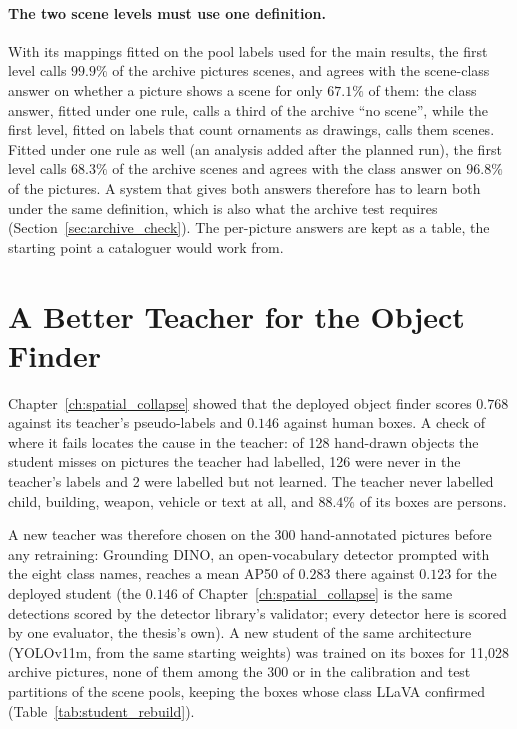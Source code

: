 \paragraph{The two scene levels must use one definition.} With its mappings fitted on the pool labels used for the main results, the first level calls $99.9\%$ of the archive pictures scenes, and agrees with the scene-class answer on whether a picture shows a scene for only $67.1\%$ of them: the class answer, fitted under one rule, calls a third of the archive ``no scene'', while the first level, fitted on labels that count ornaments as drawings, calls them scenes. Fitted under one rule as well (an analysis added after the planned run), the first level calls $68.3\%$ of the archive scenes and agrees with the class answer on $96.8\%$ of the pictures. A system that gives both answers therefore has to learn both under the same definition, which is also what the archive test requires (Section~\ref{sec:archive_check}). The per-picture answers are kept as a table, the starting point a cataloguer would work from.

\section{A Better Teacher for the Object Finder}
\label{sec:student_rebuild}

Chapter~\ref{ch:spatial_collapse} showed that the deployed object finder scores $0.768$ against its teacher's pseudo-labels and $0.146$ against human boxes. A check of where it fails locates the cause in the teacher: of 128 hand-drawn objects the student misses on pictures the teacher had labelled, 126 were never in the teacher's labels and 2 were labelled but not learned. The teacher never labelled child, building, weapon, vehicle or text at all, and $88.4\%$ of its boxes are persons.

A new teacher was therefore chosen on the 300 hand-annotated pictures before any retraining: Grounding DINO, an open-vocabulary detector prompted with the eight class names, reaches a mean AP50 of $0.283$ there against $0.123$ for the deployed student (the $0.146$ of Chapter~\ref{ch:spatial_collapse} is the same detections scored by the detector library's validator; every detector here is scored by one evaluator, the thesis's own). A new student of the same architecture (YOLOv11m, from the same starting weights) was trained on its boxes for 11,028 archive pictures, none of them among the 300 or in the calibration and test partitions of the scene pools, keeping the boxes whose class LLaVA confirmed (Table~\ref{tab:student_rebuild}).

